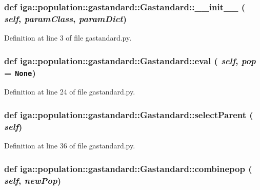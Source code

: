 \subsubsection{\setlength{\rightskip}{0pt plus 5cm}def iga::population::gastandard::Gastandard::\_\-\_\-init\_\-\_\- ( {\em self},  {\em paramClass},  {\em paramDict})}\label{classiga_1_1population_1_1gastandard_1_1Gastandard_341feff453ad2b322ab32047f17a001d}




Definition at line 3 of file gastandard.py.
\subsubsection{\setlength{\rightskip}{0pt plus 5cm}def iga::population::gastandard::Gastandard::eval ( {\em self},  {\em pop} = {\tt None})}\label{classiga_1_1population_1_1gastandard_1_1Gastandard_02b6382e371e0354102dadb1ea769078}




Definition at line 24 of file gastandard.py.
\subsubsection{\setlength{\rightskip}{0pt plus 5cm}def iga::population::gastandard::Gastandard::selectParent ( {\em self})}\label{classiga_1_1population_1_1gastandard_1_1Gastandard_70076b44ffbaadd6ce5433059bacd427}




Definition at line 36 of file gastandard.py.
\subsubsection{\setlength{\rightskip}{0pt plus 5cm}def iga::population::gastandard::Gastandard::combinepop ( {\em self},  {\em newPop})}\label{classiga_1_1population_1_1gastandard_1_1Gastandard_eb1129741123462bfe31a9a5cc2b95b8}




